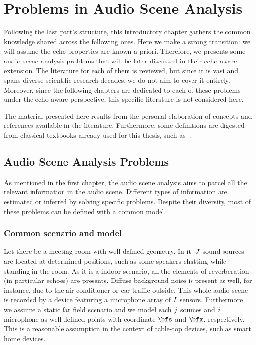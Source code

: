 \chapter{Problems in Audio Scene Analysis}\label{ch:application}

 \synopsisChApplication

\mynewline
Following the last part's structure, this introductory chapter gathers the common knowledge shared across the following ones.
Here we make a strong transition: we will assume the echo properties are known a priori.
Therefore, we presents some audio scene analysis problems that will be later discussed in their echo-aware extension.
The literature for each of them is reviewed, but since it is vast and spans diverse scientific research decades, we do not aim to cover it entirely.
Moreover, since the following chapters are dedicated to each of these problems under the echo-aware perspective, this specific literature is not considered here.

\mynewline
The material presented here results from the personal elaboration of concepts and references available in the literature.
Furthermore, some definitions are digested from classical textbooks already used for this thesis, such as~.

\section{Audio Scene Analysis Problems}\label{sec:application:scenario}
As mentioned in the first chapter, the audio scene analysis aims to parcel all the relevant information in the audio scene.
Different types of information are estimated or inferred by solving specific problems.
Despite their diversity, most of these problems can be defined with a common model.

\subsection{Common scenario and model}
Let there be a meeting room with well-defined geometry.
In it, $J$ sound sources are located at determined positions, such as some speakers chatting while standing in the room.
As it is a indoor scenario, all the elements of reverberation (in particular echoes) are presents.
Diffuse background noise is present as well, for instance, due to the air conditioner or car traffic outside.
This whole audio scene is recorded by a device featuring a microphone array of $I$ sensors.
Furthermore we assume a static far field scenario and we model each $j$ sources and $i$ microphone as well-defined points with coordinate $\positionSource$ and $\positionMicrophone$, respectively.
This is a reasonable assumption in the context of table-top devices, such as smart home devices.

